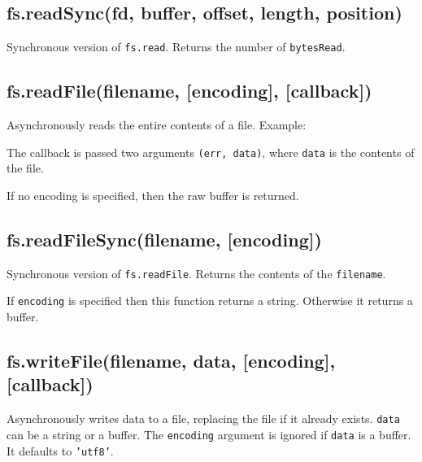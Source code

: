 \subsection{fs.readSync(fd, buffer, offset, length, position)}

Synchronous version of \texttt{fs.read}. Returns the number of
\texttt{bytesRead}.

\subsection{fs.readFile(filename, {[}encoding{]}, {[}callback{]})}

Asynchronously reads the entire contents of a file. Example:

\begin{Shaded}
\begin{Highlighting}[]
\NormalTok{(}\NormalTok{, } 
    
\NormalTok{\});}
\end{Highlighting}
\end{Shaded}

The callback is passed two arguments \texttt{(err, data)}, where
\texttt{data} is the contents of the file.

If no encoding is specified, then the raw buffer is returned.

\subsection{fs.readFileSync(filename, {[}encoding{]})}

Synchronous version of \texttt{fs.readFile}. Returns the contents of the
\texttt{filename}.

If \texttt{encoding} is specified then this function returns a string.
Otherwise it returns a buffer.

\subsection{fs.writeFile(filename, data, {[}encoding{]},
{[}callback{]})}

Asynchronously writes data to a file, replacing the file if it already
exists. \texttt{data} can be a string or a buffer. The \texttt{encoding}
argument is ignored if \texttt{data} is a buffer. It defaults to
\texttt{'utf8'}.


